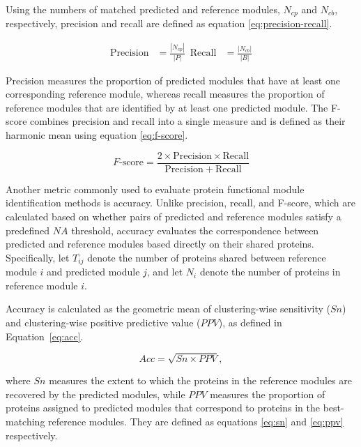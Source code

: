 Using the numbers of matched predicted and reference modules, $N_{cp}$ and $N_{cb}$, respectively, precision and recall are defined as equation \ref{eq:precision-recall}.

\begin{equation}
	\begin{aligned}
		\mathrm{Precision} &= \frac{|N_{cp}|}{|P|} \ \;
		\mathrm{Recall} &= \frac{|N_{cb}|}{|B|}
	\end{aligned}
	\label{eq:precision-recall}
\end{equation}

Precision measures the proportion of predicted modules that have at least one corresponding reference module, whereas recall measures the proportion of reference modules that are identified by at least one predicted module. The F-score combines precision and recall into a single measure and is defined as their harmonic mean using equation \ref{eq:f-score}.

\begin{equation}
	F\text{-score} =
	\frac{2 \times \mathrm{Precision} \times \mathrm{Recall}}
	{\mathrm{Precision} + \mathrm{Recall}}
	\label{eq:f-score}
\end{equation}


Another metric commonly used to evaluate protein functional module identification methods is accuracy. Unlike precision, recall, and F-score, which are calculated based on whether pairs of predicted and reference modules satisfy a predefined $NA$ threshold, accuracy evaluates the correspondence between predicted and reference modules based directly on their shared proteins. Specifically, let $T_{ij}$ denote the number of proteins shared between reference module $i$ and predicted module $j$, and let $N_i$ denote the number of proteins in reference module $i$.

Accuracy is calculated as the geometric mean of clustering-wise sensitivity ($Sn$) and clustering-wise positive predictive value ($PPV$), as defined in Equation~\ref{eq:acc}.

\begin{equation}
	Acc = \sqrt{Sn \times PPV},
	\label{eq:acc}
\end{equation}

where $Sn$ measures the extent to which the proteins in the reference modules are recovered by the predicted modules, while $PPV$ measures the proportion of proteins assigned to predicted modules that correspond to proteins in the best-matching reference modules. They are defined as equations \ref{eq:sn} and \ref{eq:ppv} respectively.

